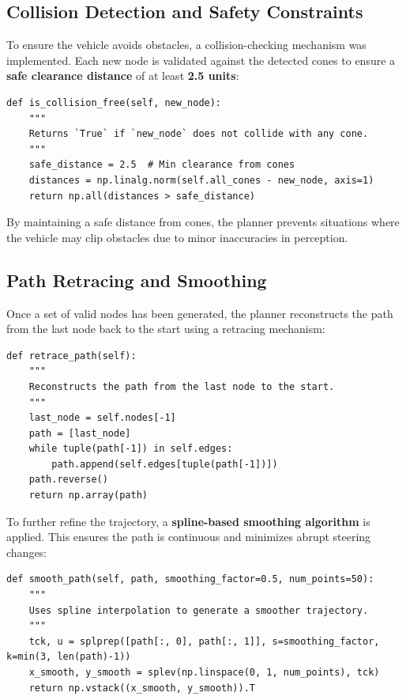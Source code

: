 \documentclass[a4paper,11pt]{report}
\begin{document}
\subsection{Collision Detection and Safety Constraints}
To ensure the vehicle avoids obstacles, a collision-checking mechanism was implemented. Each new node is validated against the detected cones to ensure a \textbf{safe clearance distance} of at least \textbf{2.5 units}:

\begin{verbatim}
def is_collision_free(self, new_node):
    """
    Returns `True` if `new_node` does not collide with any cone.
    """
    safe_distance = 2.5  # Min clearance from cones
    distances = np.linalg.norm(self.all_cones - new_node, axis=1)
    return np.all(distances > safe_distance)
\end{verbatim}

By maintaining a safe distance from cones, the planner prevents situations where the vehicle may clip obstacles due to minor inaccuracies in perception.

\subsection{Path Retracing and Smoothing}
Once a set of valid nodes has been generated, the planner reconstructs the path from the last node back to the start using a retracing mechanism:

\begin{verbatim}
def retrace_path(self):
    """
    Reconstructs the path from the last node to the start.
    """
    last_node = self.nodes[-1]
    path = [last_node]
    while tuple(path[-1]) in self.edges:
        path.append(self.edges[tuple(path[-1])])
    path.reverse()
    return np.array(path)
\end{verbatim}

To further refine the trajectory, a \textbf{spline-based smoothing algorithm} is applied. This ensures the path is continuous and minimizes abrupt steering changes:

\begin{verbatim}
def smooth_path(self, path, smoothing_factor=0.5, num_points=50):
    """
    Uses spline interpolation to generate a smoother trajectory.
    """
    tck, u = splprep([path[:, 0], path[:, 1]], s=smoothing_factor, k=min(3, len(path)-1))  
    x_smooth, y_smooth = splev(np.linspace(0, 1, num_points), tck)
    return np.vstack((x_smooth, y_smooth)).T
\end{verbatim}
\end{document}
